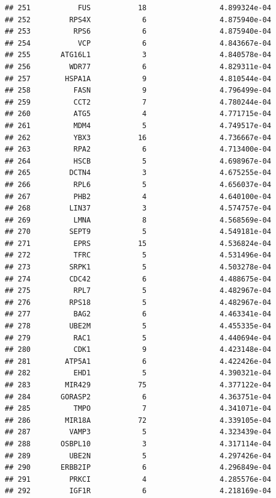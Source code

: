 \documentclass[
]{article}
\begin{document}
\begin{verbatim}
## 251           FUS           18                 4.899324e-04
## 252         RPS4X            6                 4.875940e-04
## 253          RPS6            6                 4.875940e-04
## 254           VCP            6                 4.843667e-04
## 255       ATG16L1            3                 4.840578e-04
## 256         WDR77            6                 4.829311e-04
## 257        HSPA1A            9                 4.810544e-04
## 258          FASN            9                 4.796499e-04
## 259          CCT2            7                 4.780244e-04
## 260          ATG5            4                 4.771715e-04
## 261          MDM4            5                 4.749517e-04
## 262          YBX3           16                 4.736667e-04
## 263          RPA2            6                 4.713400e-04
## 264          HSCB            5                 4.698967e-04
## 265         DCTN4            3                 4.675255e-04
## 266          RPL6            5                 4.656037e-04
## 267          PHB2            4                 4.640100e-04
## 268         LIN37            3                 4.574757e-04
## 269          LMNA            8                 4.568569e-04
## 270         SEPT9            5                 4.549181e-04
## 271          EPRS           15                 4.536824e-04
## 272          TFRC            5                 4.531496e-04
## 273         SRPK1            5                 4.503278e-04
## 274         CDC42            6                 4.488675e-04
## 275          RPL7            5                 4.482967e-04
## 276         RPS18            5                 4.482967e-04
## 277          BAG2            6                 4.463341e-04
## 278         UBE2M            5                 4.455335e-04
## 279          RAC1            5                 4.440694e-04
## 280          CDK1            9                 4.423148e-04
## 281        ATP5A1            6                 4.422426e-04
## 282          EHD1            5                 4.390321e-04
## 283        MIR429           75                 4.377122e-04
## 284       GORASP2            6                 4.363751e-04
## 285          TMPO            7                 4.341071e-04
## 286        MIR18A           72                 4.339105e-04
## 287         VAMP3            5                 4.323439e-04
## 288       OSBPL10            3                 4.317114e-04
## 289         UBE2N            5                 4.297426e-04
## 290       ERBB2IP            6                 4.296849e-04
## 291         PRKCI            4                 4.285576e-04
## 292         IGF1R            6                 4.218169e-04

\end{verbatim}
\end{document}
